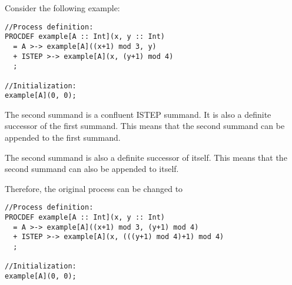 Consider the following example:

\begin{lstlisting}
//Process definition:
PROCDEF example[A :: Int](x, y :: Int)
  = A >-> example[A]((x+1) mod 3, y)
  + ISTEP >-> example[A](x, (y+1) mod 4)
  ;

//Initialization:
example[A](0, 0);
\end{lstlisting}

The second summand is a confluent ISTEP summand.
It is also a definite successor of the first summand.
This means that the second summand can be appended to the first summand.

The second summand is also a definite successor of itself.
This means that the second summand can also be appended to itself.

Therefore, the original process can be changed to

\begin{lstlisting}
//Process definition:
PROCDEF example[A :: Int](x, y :: Int)
  = A >-> example[A]((x+1) mod 3, (y+1) mod 4)
  + ISTEP >-> example[A](x, (((y+1) mod 4)+1) mod 4)
  ;

//Initialization:
example[A](0, 0);
\end{lstlisting}


